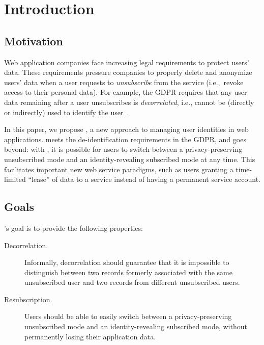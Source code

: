 \section{Introduction}

\subsection{Motivation} 

Web application companies face increasing legal requirements to protect users’ data. These
requirements pressure companies to properly delete and anonymize users' data when a user requests to
\emph{unsubscribe} from the service (i.e.,\ revoke access to their personal data).
For example, the GDPR requires that any user data remaining after a user unsubscribes is
\emph{decorrelated}, i.e., cannot be (directly or indirectly) used to identify the user~\cite{gdpr}.  

In this paper, we propose \sys, a new approach to managing user identities in web applications.
\sys{} meets the de-identification requirements in the GDPR, and goes beyond: with \sys, it is possible
for users to switch between a privacy-preserving unsubscribed mode and an identity-revealing
subscribed mode at any time. This facilitates important new web service paradigms, such as users
granting a time-limited ``lease'' of data to a service instead of having a permanent service account.

\subsection{Goals} 
\sys's goal is to provide the following properties:
\begin{description} 
    \item[Decorrelation.] Informally, decorrelation should guarantee that it is impossible to distinguish
        between two records formerly associated with the same unsubscribed user and two records from
        different unsubscribed users.  
    \item[Resubscription.] Users should be able to easily switch between a privacy-preserving unsubscribed mode 
       and an identity-revealing subscribed mode, without permanently losing their application data.  
\end{description}

